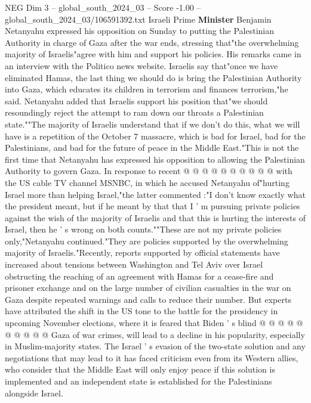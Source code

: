 \begin{textsample}{NEG Dim 3 – global\_south\_2024\_03 – Score -1.00 – global\_south\_2024\_03/106591392.txt}  \label{ex:f3_neg_050}
Israeli Prime \textbf{Minister} Benjamin Netanyahu expressed his opposition on Sunday to putting the Palestinian Authority in charge of Gaza after the war ends, stressing that"the overwhelming majority of Israelis"agree with him and support his policies.
His remarks came in an interview with the Politico news website.
Israelis say that"once we have eliminated Hamas, the last thing we should do is bring the Palestinian Authority into Gaza, which educates its children in terrorism and finances terrorism,"he said.
Netanyahu added that Israelis support his position that"we should resoundingly reject the attempt to ram down our throats a Palestinian state.""The majority of Israelis understand that if we don't do this, what we will have is a repetition of the October 7 massacre, which is bad for Israel, bad for the Palestinians, and bad for the future of peace in the Middle East."This is not the first time that Netanyahu has expressed his opposition to allowing the Palestinian Authority to govern Gaza.
In response to recent @ @ @ @ @ @ @ @ @ @ with the US cable TV channel MSNBC, in which he accused Netanyahu of"hurting Israel more than helping Israel,"the latter commented :"I don't know exactly what the president meant, but if he meant by that that I ' m pursuing private policies against the wish of the majority of Israelis and that this is hurting the interests of Israel, then he ' s wrong on both counts.""These are not my private policies only,"Netanyahu continued."They are policies supported by the overwhelming majority of Israelis."Recently, reports supported by official statements have increased about tensions between Washington and Tel Aviv over Israel obstructing the reaching of an agreement with Hamas for a cease-fire and prisoner exchange and on the large number of civilian casualties in the war on Gaza despite repeated warnings and calls to reduce their number.
But experts have attributed the shift in the US tone to the battle for the presidency in upcoming November elections, where it is feared that Biden ' s blind @ @ @ @ @ @ @ @ @ @ Gaza of war crimes, will lead to a decline in his popularity, especially in Muslim-majority states.
The Israel ' s evasion of the two-state solution and any negotiations that may lead to it has faced criticism even from its Western allies, who consider that the Middle East will only enjoy peace if this solution is implemented and an independent state is established for the Palestinians alongside Israel.

\end{textsample}

